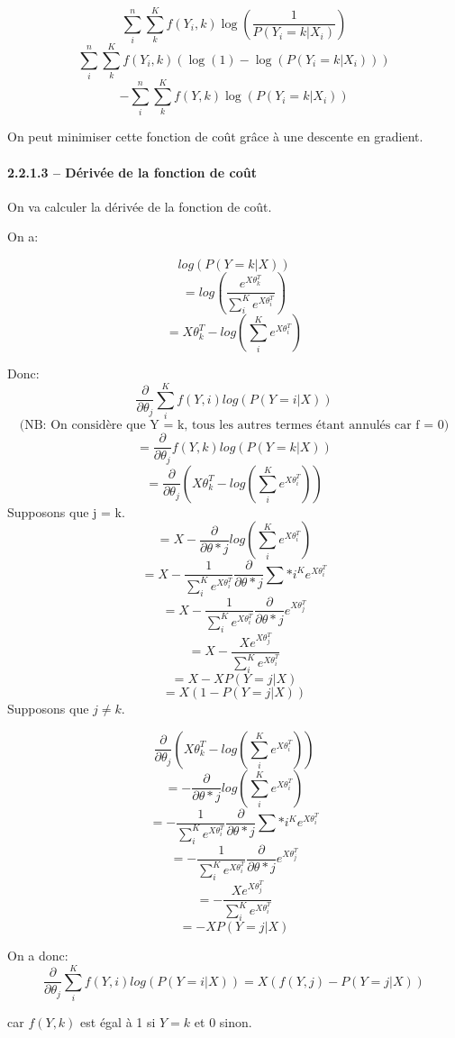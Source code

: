 \documentclass[
]{article}
\begin{document}
\[\sum_i^n \sum_k^K f(Y_i, k) \log(\frac{1}{P(Y_i = k | X_i)})\]
\[\sum_i^n \sum_k^K f(Y_i, k) (\log(1) - \log(P(Y_i = k | X_i)))\]
\[-\sum_i^n \sum_k^K f(Y, k)\log(P(Y_i = k | X_i))\]

On peut minimiser cette fonction de coût grâce à une descente en
gradient.

\paragraph{2.2.1.3 -- Dérivée de la fonction de
coût}\label{duxe9rivuxe9e-de-la-fonction-de-couxfbt}

On va calculer la dérivée de la fonction de coût.

On a:

\[log(P(Y = k | X))\]
\[=log\left(\frac{e^{X \theta_k^T}}{\sum_i^K e^{X\theta_i^T}}\right)\]
\[=X \theta_k^T - log\left(\sum_i^K e^{X \theta_i^T}\right)\]

Donc:
\[\frac{\partial}{\partial \theta_{j}} \sum_i^K f(Y, i)log(P(Y = i | X))\]
\[\text{(NB: On considère que Y = k, tous les autres termes étant annulés car f = 0)}\]
\[=\frac{\partial}{\partial \theta_{j}} f(Y, k)log(P(Y = k | X))\]
\[=\frac{\partial}{\partial \theta_{j}} \left(X \theta_{k}^T - log\left(\sum_i^K e^{X \theta_i^T}\right)\right) \]
Supposons que j = k.
\[=X - \frac{\partial}{\partial \theta*{j}}log\left(\sum_i^K e^{X \theta_i^T}\right) \]
\[=X - \frac{1}{\sum_i^K e^{X \theta_i^T}} \frac{\partial}{\partial \theta*{j}}\sum*i^K e^{X \theta_i^T} \]
\[=X - \frac{1}{\sum_i^K e^{X \theta_i^T}} \frac{\partial}{\partial \theta*{j}}e^{X \theta_j^T}\]
\[=X - \frac{X e^{X \theta_j^T}}{\sum_i^K e^{X \theta_i^T}}\]
\[=X - X P(Y = j | X)\] \[=X (1 - P(Y = j | X))\] Supposons que
\(j \neq k\).

\[\frac{\partial}{\partial \theta_{j}} \left(X \theta_{k}^T - log\left(\sum_i^K e^{X \theta_i^T}\right)\right) \]
\[= - \frac{\partial}{\partial \theta*{j}}log\left(\sum_i^K e^{X \theta_i^T}\right) \]
\[= - \frac{1}{\sum_i^K e^{X \theta_i^T}} \frac{\partial}{\partial \theta*{j}}\sum*i^K e^{X \theta_i^T} \]
\[= - \frac{1}{\sum_i^K e^{X \theta_i^T}} \frac{\partial}{\partial \theta*{j}}e^{X \theta_j^T} \]
\[= - \frac{Xe^{X \theta_j^T}}{\sum_i^K e^{X \theta_i^T}} \]
\[= -X P(Y = j | X)\]

On a donc:
\[\frac{\partial}{\partial \theta_{j}} \sum_i^K f(Y, i)log(P(Y = i | X)) = X(f(Y, j) - P(Y = j|X))\]

car \(f(Y, k)\) est égal à 1 si \(Y = k\) et 0 sinon.
\end{document}
